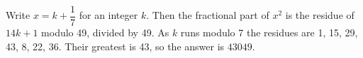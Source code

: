 Write $x=k+\dfrac{1}{7}$ for an integer $k$. Then the fractional part of $x^2$ is the residue of $14k+1$ modulo 49, divided by 49. As $k$ runs modulo 7 the residues are 1, 15, 29, 43, 8, 22, 36. Their greatest is 43, so the answer is $\boxed{43049}$.
